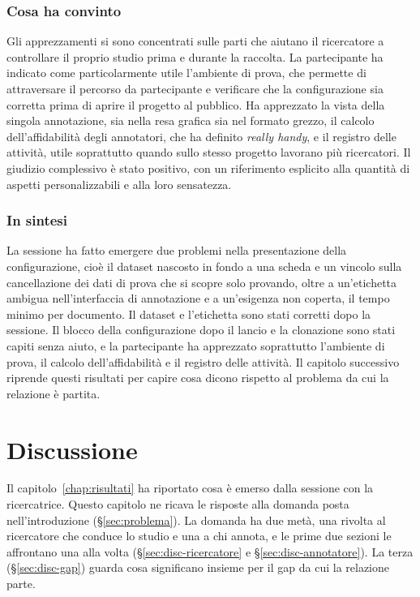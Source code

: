 \documentclass[]{sapthesis}
\begin{document}
\subsection{Cosa ha convinto}
\label{subsec:walkthrough-positivi}

Gli apprezzamenti si sono concentrati sulle parti che aiutano il ricercatore a controllare il proprio studio prima e durante la raccolta. La partecipante ha indicato come particolarmente utile l'ambiente di prova, che permette di attraversare il percorso da partecipante e verificare che la configurazione sia corretta prima di aprire il progetto al pubblico. Ha apprezzato la vista della singola annotazione, sia nella resa grafica sia nel formato grezzo, il calcolo dell'affidabilità degli annotatori, che ha definito \emph{really handy}, e il registro delle attività, utile soprattutto quando sullo stesso progetto lavorano più ricercatori. Il giudizio complessivo è stato positivo, con un riferimento esplicito alla quantità di aspetti personalizzabili e alla loro sensatezza.

\subsection{In sintesi}
\label{subsec:walkthrough-sintesi}

La sessione ha fatto emergere due problemi nella presentazione della configurazione, cioè il dataset nascosto in fondo a una scheda e un vincolo sulla cancellazione dei dati di prova che si scopre solo provando, oltre a un'etichetta ambigua nell'interfaccia di annotazione e a un'esigenza non coperta, il tempo minimo per documento. Il dataset e l'etichetta sono stati corretti dopo la sessione. Il blocco della configurazione dopo il lancio e la clonazione sono stati capiti senza aiuto, e la partecipante ha apprezzato soprattutto l'ambiente di prova, il calcolo dell'affidabilità e il registro delle attività. Il capitolo successivo riprende questi risultati per capire cosa dicono rispetto al problema da cui la relazione è partita.

\chapter{Discussione}
\label{cap:discussione}

Il capitolo~\ref{chap:risultati} ha riportato cosa è emerso dalla sessione con la ricercatrice. Questo capitolo ne ricava le risposte alla domanda posta nell'introduzione (\S\ref{sec:problema}). La domanda ha due metà, una rivolta al ricercatore che conduce lo studio e una a chi annota, e le prime due sezioni le affrontano una alla volta (\S\ref{sec:disc-ricercatore} e \S\ref{sec:disc-annotatore}). La terza (\S\ref{sec:disc-gap}) guarda cosa significano insieme per il gap da cui la relazione parte.
\end{document}
